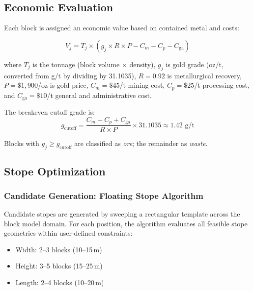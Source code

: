 \documentclass[12pt,a4paper]{article}
\begin{document}
\subsection{Economic Evaluation}
\label{sec:economics}

Each block is assigned an economic value based on contained metal and costs:

\begin{equation}
    V_j = T_j \times \left( g_j \times R \times P - C_m - C_p - C_{\text{ga}} \right)
    \label{eq:block-value}
\end{equation}

where $T_j$ is the tonnage (block volume $\times$ density), $g_j$ is gold grade (oz/t, converted from g/t by dividing by 31.1035), $R = 0.92$ is metallurgical recovery, $P = \$1{,}900$/oz is gold price, $C_m = \$45$/t mining cost, $C_p = \$25$/t processing cost, and $C_{\text{ga}} = \$10$/t general and administrative cost.

The breakeven cutoff grade is:
\begin{equation}
    g_{\text{cutoff}} = \frac{C_m + C_p + C_{\text{ga}}}{R \times P} \times 31.1035 \approx 1.42 \text{ g/t}
\end{equation}

Blocks with $g_j \geq g_{\text{cutoff}}$ are classified as \textit{ore}; the remainder as \textit{waste}.

\subsection{Stope Optimization}
\label{sec:stope-opt}

\subsubsection{Candidate Generation: Floating Stope Algorithm}

Candidate stopes are generated by sweeping a rectangular template across the block model domain. For each position, the algorithm evaluates all feasible stope geometries within user-defined constraints:

\begin{itemize}[itemsep=0.1em]
    \item Width: 2--3 blocks (10--15\,m)
    \item Height: 3--5 blocks (15--25\,m)
    \item Length: 2--4 blocks (10--20\,m)
\end{itemize}
\end{document}
